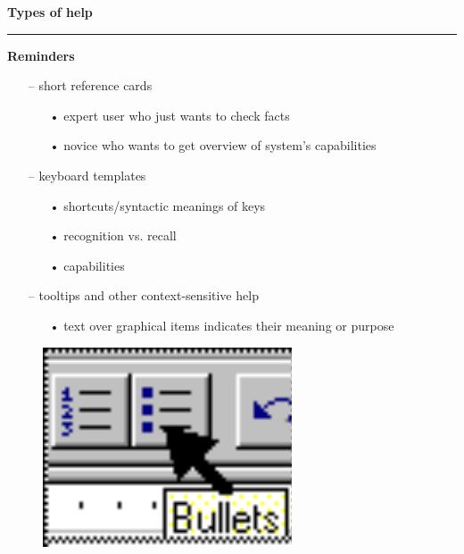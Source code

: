 \documentclass[pdf]{beamer}
\begin{document}
\begin{frame}
{\textbf{Types of help}}{\textcolor{red}{\rule{12cm}{1.2pt}}}
	
 	\bigskip

  	\textbf{Reminders}
	\begin{itemize}
		\item[--] {short reference cards}
		\begin{itemize}
        	\item[{•}] {expert user who just wants to check facts}
			\item[{•}] {novice who wants to get overview of system’s capabilities}
        \end{itemize}
		\medskip
		\item[--] {keyboard templates}
      	\begin{itemize}
        	\item[{•}] {shortcuts/syntactic meanings of keys}
        	\item[{•}] {recognition vs. recall}
        	\item[{•}] {capabilities}
        \end{itemize}
        \medskip
		\item[--] {tooltips and other context-sensitive help}
      	\begin{itemize}
        	\item[{•}] {text over graphical items indicates their meaning or purpose}
        \end{itemize}
    \end{itemize}
    \begin{figure}[b]
    	\includegraphics[scale = 0.5, right]{54_picture.png}
    \end{figure}
    \vspace{10px}\hspace{-24px}\fontsize{8pt}{1pt}\selectfont{\color{gray}{Microsoft Word}} 
    
\end{frame}
\end{document}
